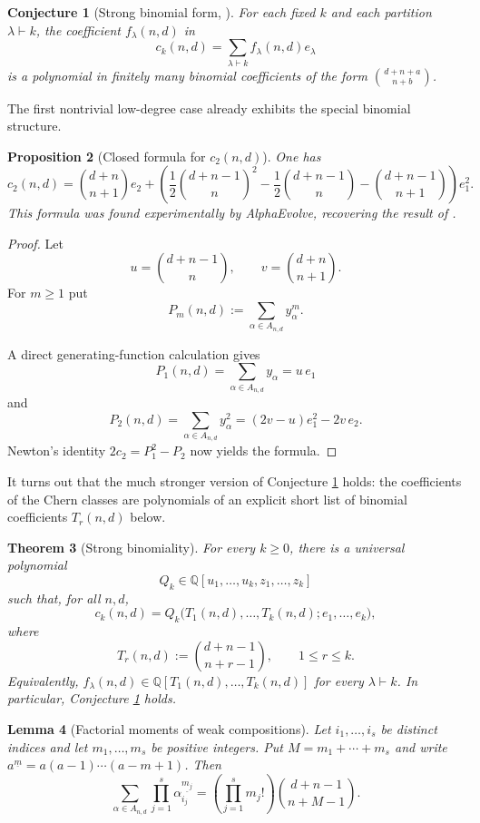 \documentclass[11pt]{amsart}
\numberwithin{equation}{section}
\newtheorem{theorem}{Theorem}[section]
\newtheorem{lemma}[theorem]{Lemma}
\newtheorem{proposition}[theorem]{Proposition}
\newtheorem{conjecture}[theorem]{Conjecture}
\theoremstyle{remark}
\newcommand{\Q}{\mathbb Q}
\begin{document}
\begin{conjecture}[Strong binomial form, \cite{feher2025polynomiality}]\label{conj:binomial-form}
For each fixed $k$ and each partition $\lambda\vdash k$, the coefficient $f_\lambda(n,d)$ in
\[
  c_k(n,d)=\sum_{\lambda\vdash k}f_\lambda(n,d)e_\lambda
\]
is a polynomial in finitely many binomial coefficients of the form $\binom{d+n+a}{n+b}$.
\end{conjecture}

The first nontrivial low-degree case already exhibits the special binomial structure.

\begin{proposition}[Closed formula for $c_2(n,d)$]\label{prop:c2}
One has
\[
  c_2(n,d)=\binom{d+n}{n+1}e_2+
  \left(
    \frac12\binom{d+n-1}{n}^2
    -\frac12\binom{d+n-1}{n}
    -\binom{d+n-1}{n+1}
  \right)e_1^2.
\]
This formula was  found experimentally by AlphaEvolve, recovering the result of \cite{ciliberto_zaidenberg2020onfanoschemes}.
\end{proposition}

\begin{proof}
Let
\[
  u=\binom{d+n-1}{n},\qquad v=\binom{d+n}{n+1}.
\]
For $m\ge1$ put
\[
  P_m(n,d):=\sum_{\alpha\in A_{n,d}}y_\alpha^m.
\]

A direct generating-function calculation gives
\[
  P_1(n,d)=\sum_{\alpha\in A_{n,d}}y_\alpha=u\,e_1
\]
and
\[
  P_2(n,d)=\sum_{\alpha\in A_{n,d}}y_\alpha^2=(2v-u)e_1^2-2v\,e_2.
\]
Newton's identity $2c_2=P_1^2-P_2$ now yields the formula.
\end{proof}


It turns out that the much stronger version of Conjecture \ref{conj:binomial-form} holds: the coefficients of the Chern classes are polynomials of an explicit short list of binomial coefficients $T_r(n,d)$ below. 

\begin{theorem}[Strong binomiality]\label{thm:strong-binomiality}
For every $k\ge0$, there is a universal polynomial
\[
  Q_k\in\Q[u_1,\ldots,u_k,z_1,\ldots,z_k]
\]
such that, for all $n,d$,
\[
  c_k(n,d)=Q_k\bigl(T_1(n,d),\ldots,T_k(n,d);e_1,\ldots,e_k\bigr),
\]
where
\[
  T_r(n,d):=\binom{d+n-1}{n+r-1},\qquad 1\le r\le k.
\]
Equivalently, $f_\lambda(n,d)\in\Q[T_1(n,d),\ldots,T_k(n,d)]$ for every $\lambda\vdash k$.  In particular, Conjecture \ref{conj:binomial-form} holds.
\end{theorem}

\begin{lemma}[Factorial moments of weak compositions]\label{lem:factorial-moments}
Let $i_1,\ldots,i_s$ be distinct indices and let $m_1,\ldots,m_s$ be positive integers.  Put $M=m_1+\cdots+m_s$ and write $a^{\underline m}=a(a-1)\cdots(a-m+1)$.  Then
\begin{equation}\label{eq:factorial-moments}
  \sum_{\alpha\in A_{n,d}}\prod_{j=1}^s \alpha_{i_j}^{\underline {m_j}}
  =
  \left(\prod_{j=1}^s m_j!\right)\binom{d+n-1}{n+M-1}.
\end{equation}
\end{lemma}
\end{document}
